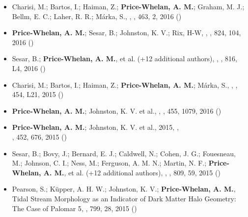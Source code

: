 \documentclass[12pt,letterpaper]{article}
\begin{document}
\begin{itemize}
\item Charisi, M.; Bartos, I.; Haiman, Z.; {\bf Price-Whelan, A. M.}; Graham, M. J.; Bellm, E. C.; Laher, R. R.; M\'arka, S.,
    ,
    \mnras, 463, 2, 2016 ()

\item {\bf Price-Whelan, A. M.}; Sesar, B.; Johnston, K. V.; Rix, H-W,
    ,
    \apj, 824, 104, 2016 ()

\item Sesar, B.; {\bf Price-Whelan, A. M.}, et al. (+12 additional authors),
    ,
    \apjl, 816, L4, 2016 ()

\item Charisi, M.; Bartos, I.; Haiman, Z.; {\bf Price-Whelan, A. M.}; M\'arka, S.,
    ,
    \mnrasl, 454, L21, 2015 ()

\item {\bf Price-Whelan, A. M.}; Johnston, K. V. et al.,
    ,
    \mnras, 455, 1079, 2016 ()

\item {\bf Price-Whelan, A. M.}; Johnston, K. V. et al., 2015,
    ,\\
    \mnras, 452, 676, 2015 ()

\item Sesar, B.; Bovy, J.; Bernard, E. J.; Caldwell, N.; Cohen, J. G.; Fouesneau, M.; Johnson, C. I.; Ness, M.; Ferguson, A. M. N.; Martin, N. F.; {\bf Price-Whelan, A. M.}, et al. (+12 additional authors),
    ,
    \apj, 809, 59, 2015 ()

\item Pearson, S.; K\"upper, A. H. W.; Johnston, K. V.; {\bf Price-Whelan, A. M.},
    {Tidal Stream Morphology as an Indicator of Dark Matter Halo Geometry: The Case of Palomar 5},
    \apj, 799, 28, 2015 ()


\end{itemize}
\end{document}
